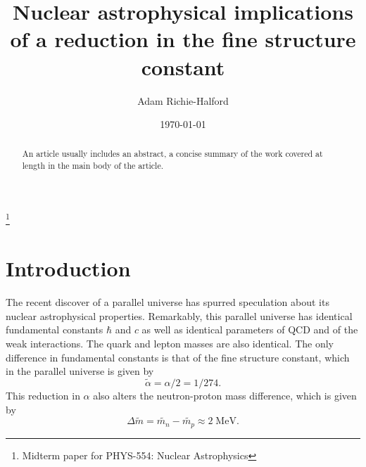 \documentclass[%
 reprint,
 amsmath,amssymb,
 aps,
]{revtex4-1}
\begin{document}

\title{Nuclear astrophysical implications of a reduction in the fine structure constant}%
\thanks{Midterm paper for PHYS-554: Nuclear Astrophysics}%

\author{Adam Richie-Halford}

\date{\today}%

\begin{abstract}
An article usually includes an abstract, a concise summary of the work
covered at length in the main body of the article. 
\end{abstract}

\maketitle


\section{\label{sec:intro}Introduction}

The recent discover of a parallel universe\cite{ReddyMidterm} has spurred speculation about its nuclear astrophysical properties. Remarkably, this parallel universe has identical fundamental constants $\hbar$ and $c$ as well as identical parameters of QCD and of the weak interactions. The quark and lepton masses are also identical. The only difference in fundamental constants is that of the fine structure constant, which in the parallel universe is given by
\begin{equation}
	\widetilde{\alpha} = \alpha / 2 = 1 / 274.
\end{equation}
This reduction in $\alpha$ also alters the neutron-proton mass difference, which is given by\cite{ReddyMidterm}
\begin{equation}
	\Delta \widetilde{m} = \widetilde{m_n} - \widetilde{m_p} \approx 2 \; \text{MeV}.
\end{equation}
\end{document}
